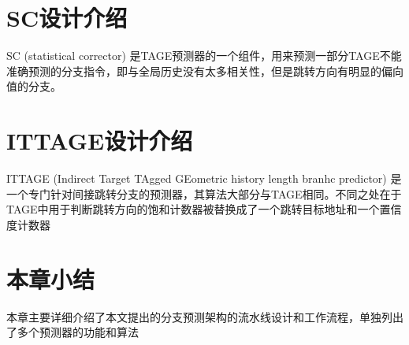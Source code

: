 \section{SC设计介绍}

SC (statistical corrector) 是TAGE预测器的一个组件，用来预测一部分TAGE不能准确预测的分支指令，即与全局历史没有太多相关性，但是跳转方向有明显的偏向值的分支。

\section{ITTAGE设计介绍}

ITTAGE (Indirect Target TAgged GEometric history length branhc predictor) 是一个专门针对间接跳转分支的预测器，其算法大部分与TAGE相同。不同之处在于TAGE中用于判断跳转方向的饱和计数器被替换成了一个跳转目标地址和一个置信度计数器

\section{本章小结}

本章主要详细介绍了本文提出的分支预测架构的流水线设计和工作流程，单独列出了多个预测器的功能和算法